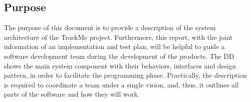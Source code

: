 \subsection{Purpose}
The purpose of this document is to provide a description of the system architecture of the TrackMe project. Furthermore, this report,
with the joint information of an implementation and test plan, will be helpful to guide a software development team during the 
development of the products. 
The DD shows the main system component with their behaviors, interfaces and design pattern, in order to facilitate the programming phase.
Practically, the description is required to coordinate a team under a single vision, and, thus, it outlines all parts of the software and how
they will work.